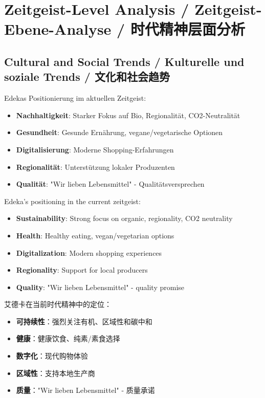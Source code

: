 \chapter{Zeitgeist-Level Analysis / Zeitgeist-Ebene-Analyse / 时代精神层面分析}

\section{Cultural and Social Trends / Kulturelle und soziale Trends / 文化和社会趋势}

\begin{otherlanguage}{ngerman}
Edekas Positionierung im aktuellen Zeitgeist:
\begin{itemize}
    \item \textbf{Nachhaltigkeit}: Starker Fokus auf Bio, Regionalität, CO2-Neutralität
    \item \textbf{Gesundheit}: Gesunde Ernährung, vegane/vegetarische Optionen
    \item \textbf{Digitalisierung}: Moderne Shopping-Erfahrungen
    \item \textbf{Regionalität}: Unterstützung lokaler Produzenten
    \item \textbf{Qualität}: "Wir lieben Lebensmittel" - Qualitätsversprechen
\end{itemize}
\end{otherlanguage}

Edeka's positioning in the current zeitgeist:
\begin{itemize}
    \item \textbf{Sustainability}: Strong focus on organic, regionality, CO2 neutrality
    \item \textbf{Health}: Healthy eating, vegan/vegetarian options
    \item \textbf{Digitalization}: Modern shopping experiences
    \item \textbf{Regionality}: Support for local producers
    \item \textbf{Quality}: "Wir lieben Lebensmittel" - quality promise
\end{itemize}

艾德卡在当前时代精神中的定位：
\begin{itemize}
    \item \textbf{可持续性}：强烈关注有机、区域性和碳中和
    \item \textbf{健康}：健康饮食、纯素/素食选择
    \item \textbf{数字化}：现代购物体验
    \item \textbf{区域性}：支持本地生产商
    \item \textbf{质量}："Wir lieben Lebensmittel" - 质量承诺
\end{itemize}

